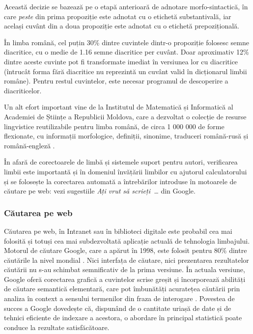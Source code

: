 \begin{multicols}{2}
Această decizie se bazează pe o etapă anterioară de adnotare morfo-sintactică, în care \textit{peste} din prima propoziție este adnotat cu o etichetă substantivală, iar același cuvânt din a doua propoziție este adnotat cu o etichetă prepozițională.

În limba română, cel puțin 30\% dintre cuvintele \mbox{dintr-o} propoziție folosesc semne diacritice, cu o medie de 1.16 semne diacritice per cuvânt. Doar aproximativ 12\% dintre aceste cuvinte pot fi transformate imediat în versiunea lor cu diacritice (întrucât forma fără diacritice nu reprezintă un cuvânt valid în dicționarul limbii române). Pentru restul cuvintelor, este necesar programul de descoperire a diacriticelor.

Un alt efort important vine de la Institutul de Matematică și Informatică al Academiei de Științe a Republicii Moldova, care a dezvoltat o colecție de resurse lingvistice reutilizabile pentru limba română, de circa 1 000 000 de forme flexionate, cu informații morfologice, definiții, sinonime, traduceri română-rusă și română-engleză \cite{elrr}.

În afară de corectoarele de limbă și sistemele suport pentru autori, verificarea limbii este importantă și în domeniul învățării limbilor cu ajutorul calculatorului și se folosește la corectarea automată a întrebărilor introduse în motoarele de căutare pe web: vezi sugestiile \textit{Ați vrut să scrieți~\dots} din Google.

\subsubsection{Căutarea pe web}

Căutarea pe web, în Intranet sau în biblioteci digitale este probabil cea mai folosită și totuși cea mai subdezvoltată aplicație actuală de tehnologia limbajului. Motorul de căutare Google, care a apărut în 1998, este folosit pentru 80\% dintre căutările la nivel mondial \cite{spi1}. Nici interfața de căutare, nici prezentarea rezultatelor căutării nu s-au schimbat semnificativ de la prima versiune. În actuala versiune, Google oferă corectarea grafică a cuvintelor scrise greșit și încorporează abilități de căutare semantică elementară, care pot îmbunătăți acuratețea căutării prin analiza în context a sensului termenilor din fraza de interogare \cite{pc1}. Povestea de succes a Google dovedește că, dispunând de o cantitate uriașă de date și de tehnici eficiente de indexare a acestora, o abordare în principal statistică poate conduce la rezultate satisfăcătoare.


\end{multicols}

